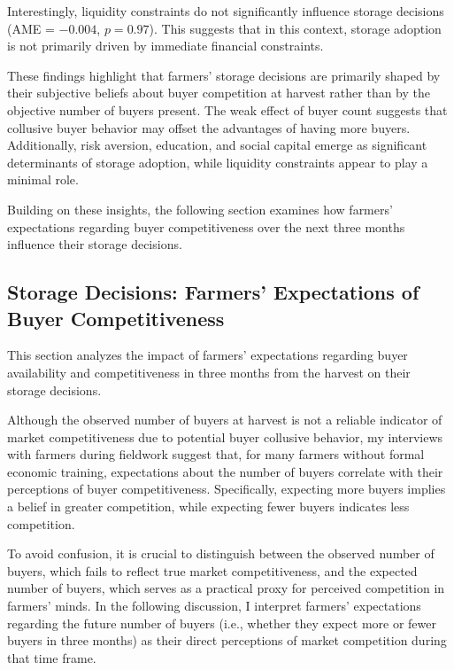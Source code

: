 Interestingly, liquidity constraints do not significantly influence storage decisions (AME = \(-0.004\), \(p=0.97\)). This suggests that in this context, storage adoption is not primarily driven by immediate financial constraints.

These findings highlight that farmers' storage decisions are primarily shaped by their subjective beliefs about buyer competition at harvest rather than by the objective number of buyers present. The weak effect of buyer count suggests that collusive buyer behavior may offset the advantages of having more buyers. Additionally, risk aversion, education, and social capital emerge as significant determinants of storage adoption, while liquidity constraints appear to play a minimal role.

Building on these insights, the following section examines how farmers' expectations regarding buyer competitiveness over the next three months influence their storage decisions.




\subsection{Storage Decisions: Farmers' Expectations of Buyer Competitiveness}

\noindent This section analyzes the impact of farmers' expectations regarding buyer availability and competitiveness in three months from the harvest on their storage decisions. 

Although the observed number of buyers at harvest is not a reliable indicator of market competitiveness due to potential buyer collusive behavior, my interviews with farmers during fieldwork suggest that, for many farmers without formal economic training, expectations about the number of buyers correlate with their perceptions of buyer competitiveness. Specifically, expecting more buyers implies a belief in greater competition, while expecting fewer buyers indicates less competition.

To avoid confusion, it is crucial to distinguish between the observed number of buyers, which fails to reflect true market competitiveness, and the expected number of buyers, which serves as a practical proxy for perceived competition in farmers' minds. In the following discussion, I interpret farmers' expectations regarding the future number of buyers (i.e., whether they expect more or fewer buyers in three months) as their direct perceptions of market competition during that time frame.

